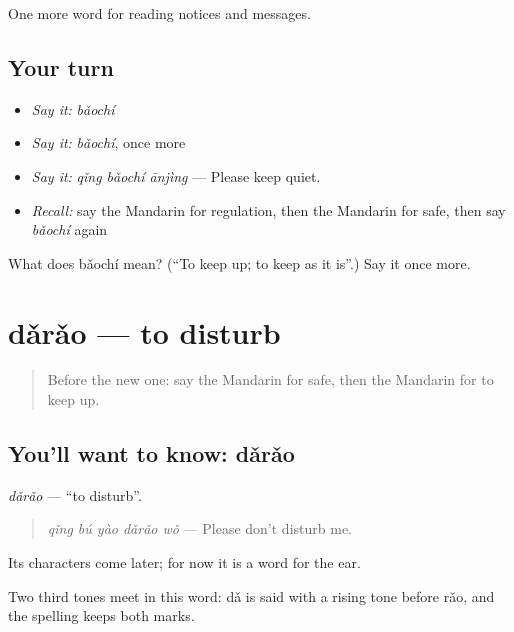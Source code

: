 \begin{grammarlens}[title={What you've built}]
One more word for reading notices and messages.
\end{grammarlens}

\subsection*{Your turn}
\begin{itemize}
\raggedright
  \item \emph{Say it:} \emph{bǎochí}
  \item \emph{Say it:} \emph{bǎochí}, once more
  \item \emph{Say it:} \emph{qǐng bǎochí ānjìng} — Please keep quiet.
  \item \emph{Recall:} say the Mandarin for regulation, then the Mandarin for safe, then say \emph{bǎochí} again
\end{itemize}

\begin{tcolorbox}[breakable,colback=teal!4,colframe=teal!35!black,title={Before you move on}]
What does bǎochí mean? (\textquotedblleft{}To keep up; to keep as it is\textquotedblright{}.) Say it once more.
\end{tcolorbox}
\section[dǎrǎo]{dǎrǎo — to disturb}

\label{lesson:ZH-C209-darao}



\begin{quote}
Before the new one: say the Mandarin for safe, then the Mandarin for to keep up.
\end{quote}

\subsection*{You'll want to know: dǎrǎo}
\emph{dǎrǎo} — \textquotedblleft{}to disturb\textquotedblright{}.

\begin{quote}
\emph{qǐng bú yào dǎrǎo wǒ} — Please don't disturb me.
\end{quote}

Its characters come later; for now it is a word for the ear.

Two third tones meet in this word: dǎ is said with a rising tone before rǎo, and the spelling keeps both marks.

